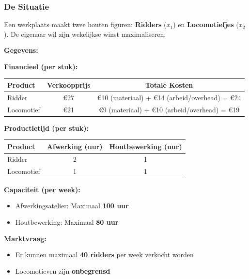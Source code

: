 \documentclass[a4paper,11pt]{article}
\begin{document}
\begin{oefenblok}[title=Lineair Programmeren — De Ambachtelijke Werkplaats]

\subsubsection*{De Situatie}
Een werkplaats maakt twee houten figuren: \textbf{Ridders} ($x_1$) en \textbf{Locomotiefjes} ($x_2$). 
De eigenaar wil zijn wekelijkse winst maximaliseren.

\textbf{Gegevens:}

\textbf{Financieel (per stuk):}

\begin{center}
\begin{tabular}{|l|c|c|}
\hline
\textbf{Product} & \textbf{Verkoopprijs} & \textbf{Totale Kosten} \\
\hline
Ridder & €27 & €10 (materiaal) + €14 (arbeid/overhead) = €24 \\
\hline
Locomotief & €21 & €9 (materiaal) + €10 (arbeid/overhead) = €19 \\
\hline
\end{tabular}
\end{center}

\textbf{Productietijd (per stuk):}

\begin{center}
\begin{tabular}{|l|c|c|}
\hline
\textbf{Product} & \textbf{Afwerking (uur)} & \textbf{Houtbewerking (uur)} \\
\hline
Ridder & 2 & 1 \\
\hline
Locomotief & 1 & 1 \\
\hline
\end{tabular}
\end{center}

\textbf{Capaciteit (per week):}
\begin{itemize}
    \item Afwerkingsatelier: Maximaal \textbf{100 uur}
    \item Houtbewerking: Maximaal \textbf{80 uur}
\end{itemize}

\textbf{Marktvraag:}
\begin{itemize}
    \item Er kunnen maximaal \textbf{40 ridders} per week verkocht worden
    \item Locomotieven zijn \textbf{onbegrensd}
\end{itemize}


\end{oefenblok}
\end{document}
